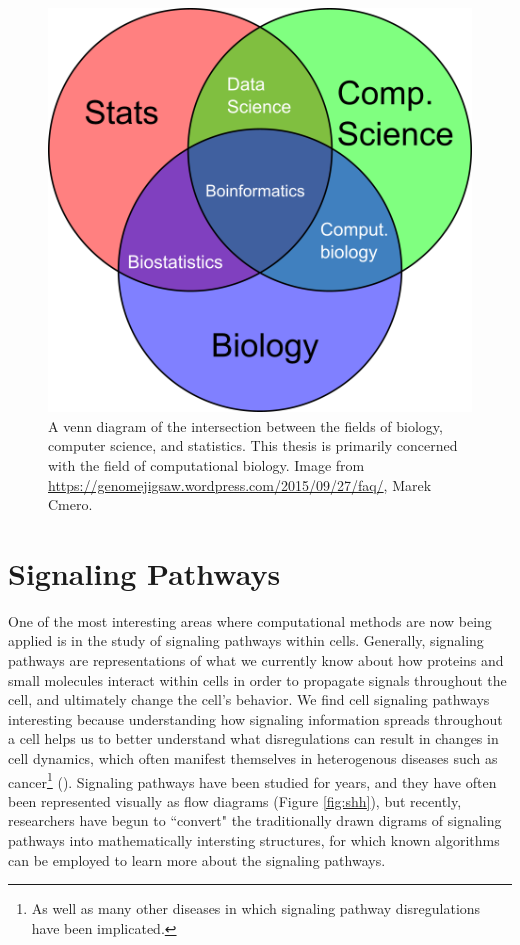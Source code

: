 \documentclass[12pt,twoside]{reedthesis}
\theoremstyle{definition}
\begin{document}
 \begin{figure}[!h]
   \begin{center}
     \includegraphics[width=\textwidth/2]{bioinformatics_venn}
   \caption[Bioinformatic fields.]{A venn diagram of the intersection between the fields of biology, computer science, and statistics. This thesis is primarily concerned with the field of computational biology. Image from \url{https://genomejigsaw.wordpress.com/2015/09/27/faq/}, Marek Cmero.}
   \label{fig:bioinf_venn}
   \end{center}
 \end{figure}

 \section{Signaling Pathways}

 One of the most interesting areas where computational methods are now being applied is in the study of signaling pathways within cells. Generally, signaling pathways are representations of what we currently know about how proteins and small molecules interact within cells in order to propagate signals throughout the cell, and ultimately change the cell's behavior. We find cell signaling pathways interesting because understanding how signaling information spreads throughout a cell helps us to better understand what disregulations can result in changes in cell dynamics, which often manifest themselves in heterogenous diseases such as cancer\footnote{As well as many other diseases in which signaling pathway disregulations have been implicated.} (\cite{Taylor2009}). Signaling pathways have been studied for years, and they have often been represented visually as flow diagrams (Figure \ref{fig:shh}), but recently, researchers have begun to ``convert" the traditionally drawn digrams of signaling pathways into mathematically intersting structures, for which known algorithms can be employed to learn more about the signaling pathways.\par
\end{document}
